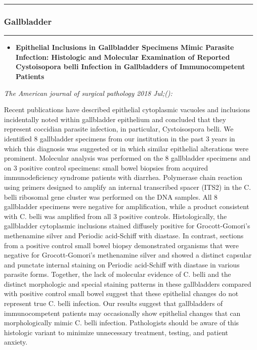 \documentclass[]{article}
\providecommand{\tightlist}{%
  \setlength{\itemsep}{0pt}\setlength{\parskip}{0pt}}
\begin{document}
\begin{center}\rule{0.5\linewidth}{\linethickness}\end{center}

\hypertarget{gallbladder}{%
\subsubsection{Gallbladder}\label{gallbladder}}

\begin{center}\rule{0.5\linewidth}{\linethickness}\end{center}

\begin{itemize}
\tightlist
\item
  \textbf{Epithelial Inclusions in Gallbladder Specimens Mimic Parasite
  Infection: Histologic and Molecular Examination of Reported
  Cystoisopora belli Infection in Gallbladders of Immunocompetent
  Patients}
\end{itemize}

\emph{The American journal of surgical pathology 2018 Jul;():}

Recent publications have described epithelial cytoplasmic vacuoles and
inclusions incidentally noted within gallbladder epithelium and
concluded that they represent coccidian parasite infection, in
particular, Cystoisospora belli. We identified 8 gallbladder specimens
from our institution in the past 3 years in which this diagnosis was
suggested or in which similar epithelial alterations were prominent.
Molecular analysis was performed on the 8 gallbladder specimens and on 3
positive control specimens: small bowel biopsies from acquired
immunodeficiency syndrome patients with diarrhea. Polymerase chain
reaction using primers designed to amplify an internal transcribed
spacer (ITS2) in the C. belli ribosomal gene cluster was performed on
the DNA samples. All 8 gallbladder specimens were negative for
amplification, while a product consistent with C. belli was amplified
from all 3 positive controls. Histologically, the gallbladder
cytoplasmic inclusions stained diffusely positive for Grocott-Gomori's
methenamine silver and Periodic acid-Schiff with diastase. In contrast,
sections from a positive control small bowel biopsy demonstrated
organisms that were negative for Grocott-Gomori's methenamine silver and
showed a distinct capsular and punctate internal staining on Periodic
acid-Schiff with diastase in various parasite forms. Together, the lack
of molecular evidence of C. belli and the distinct morphologic and
special staining patterns in these gallbladders compared with positive
control small bowel suggest that these epithelial changes do not
represent true C. belli infection. Our results suggest that gallbladders
of immunocompetent patients may occasionally show epithelial changes
that can morphologically mimic C. belli infection. Pathologists should
be aware of this histologic variant to minimize unnecessary treatment,
testing, and patient anxiety.
\end{document}
